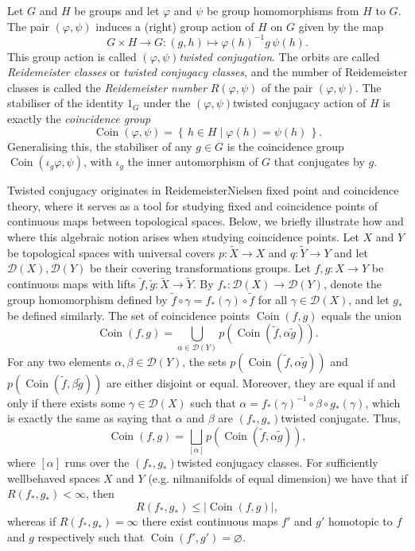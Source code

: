 \documentclass[a4paper,11pt]{report}
\begin{document}
{
  Let $G$ and $H$ be groups and let $\varphi$ and $\psi$ be group homomorphisms from $H$ to $G$. The pair $(\varphi,\psi)$ induces a (right) group action of $H$ on $G$ given by the map 
\[G \times H \to G \colon (g,h) \mapsto \varphi(h)^{-1} g\,\psi(h).\]
 This group action is called \emph{$(\varphi,\psi)$\texttt{}twisted conjugation}. The orbits are called \emph{Reidemeister classes} or \emph{twisted conjugacy classes}, and the number of Reidemeister classes is called the \emph{Reidemeister number} $R(\varphi,\psi)$ of the pair $(\varphi,\psi)$. The stabiliser of the identity $1_G$ under the $(\varphi,\psi)$\texttt{}twisted conjugacy action of $H$ is exactly the \emph{coincidence group} 
\[\operatorname{Coin}(\varphi,\psi) = \left\{\, h \in H \mid \varphi(h) =
\psi(h) \, \right\}.\]
 Generalising this, the stabiliser of any $g \in G$ is the coincidence group $\operatorname{Coin}(\iota_g\varphi,\psi)$, with $\iota_g$ the inner automorphism of $G$ that conjugates by $g$. 

 Twisted conjugacy originates in Reidemeister\texttt{}Nielsen fixed
point and coincidence theory, where it serves as a tool for studying fixed and
coincidence points of continuous maps between topological spaces. Below, we
briefly illustrate how and where this algebraic notion arises when studying
coincidence points. Let $X$ and $Y$ be topological spaces with universal covers $p \colon \tilde{X} \to X$ and $q \colon \tilde{Y} \to Y$ and let $\mathcal{D}(X), \mathcal{D}(Y)$ be their covering transformations groups. Let $f,g \colon X \to Y$ be continuous maps with lifts $\tilde{f}, \tilde{g} \colon \tilde{X} \to \tilde{Y}$. By $f_*\colon \mathcal{D}(X) \to \mathcal{D}(Y)$, denote the group homomorphism defined by $\tilde{f} \circ \gamma = f_*(\gamma) \circ \tilde{f}$ for all $\gamma \in \mathcal{D}(X)$, and let $g_*$ be defined similarly. The set of coincidence points $\operatorname{Coin}(f,g)$ equals the union 
\[\operatorname{Coin}(f,g) = \bigcup_{\alpha \in \mathcal{D}(Y)}
p(\operatorname{Coin}(\tilde{f}, \alpha \tilde{g})).\]
 For any two elements $\alpha, \beta \in \mathcal{D}(Y)$, the sets $p(\operatorname{Coin}(\tilde{f}, \alpha \tilde{g}))$ and $p(\operatorname{Coin}(\tilde{f}, \beta \tilde{g}))$ are either disjoint or equal. Moreover, they are equal if and only if there
exists some $\gamma \in \mathcal{D}(X)$ such that $\alpha = f_*(\gamma)^{-1} \circ \beta \circ g_*(\gamma)$, which is exactly the same as saying that $\alpha$ and $\beta$ are $(f_*,g_*)$\texttt{}twisted conjugate. Thus, 
\[\operatorname{Coin}(f,g) = \bigsqcup_{[\alpha]}
p(\operatorname{Coin}(\tilde{f}, \alpha \tilde{g})),\]
 where $[\alpha]$ runs over the $(f_*,g_*)$\texttt{}twisted conjugacy classes. For sufficiently
well\texttt{}behaved spaces $X$ and $Y$ (e.g. nilmanifolds of equal dimension) we have that if $R(f_*,g_*) < \infty$, then 
\[R(f_*,g_*) \leq \left|\operatorname{Coin}(f,g)\right|,\]
 whereas if $R(f_*,g_*) = \infty$ there exist continuous maps $f'$ and $g'$ homotopic to $f$ and $g$ respectively such that $\operatorname{Coin}(f',g') = \varnothing$. }
\end{document}
